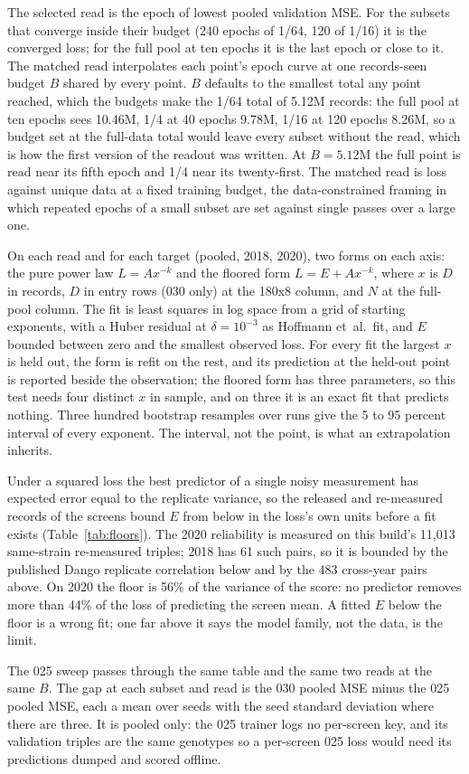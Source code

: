 The selected read is the epoch of lowest pooled validation MSE. For the subsets
that converge inside their budget (240 epochs of 1/64, 120 of 1/16) it is the
converged loss; for the full pool at ten epochs it is the last epoch or close to
it. The matched read interpolates each point's epoch curve at one records-seen
budget $B$ shared by every point. $B$ defaults to the smallest total any point
reached, which the budgets make the 1/64 total of 5.12M records: the full pool at
ten epochs sees 10.46M, 1/4 at 40 epochs 9.78M, 1/16 at 120 epochs 8.26M, so a
budget set at the full-data total would leave every subset without the read,
which is how the first version of the readout was written. At $B = 5.12$M the
full point is read near its fifth epoch and 1/4 near its twenty-first. The
matched read is loss against unique data at a fixed training budget, the
data-constrained framing in which repeated epochs of a small subset are set
against single passes over a large one.

On each read and for each target (pooled, 2018, 2020), two forms on each axis:
the pure power law $L = A x^{-k}$ and the floored form $L = E + A x^{-k}$, where
$x$ is $D$ in records, $D$ in entry rows (030 only) at the 180x8 column, and $N$
at the full-pool column. The fit is least squares in log space from a grid of
starting exponents, with a Huber residual at $\delta = 10^{-3}$ as Hoffmann
et~al.\ fit, and $E$ bounded between zero and the smallest observed loss. For
every fit the largest $x$ is held out, the form is refit on the rest, and its
prediction at the held-out point is reported beside the observation; the floored
form has three parameters, so this test needs four distinct $x$ in sample, and
on three it is an exact fit that predicts nothing. Three hundred bootstrap
resamples over runs give the 5 to 95 percent interval of every exponent. The
interval, not the point, is what an extrapolation inherits.

Under a squared loss the best predictor of a single noisy measurement has
expected error equal to the replicate variance, so the released and re-measured
records of the screens bound $E$ from below in the loss's own units before a fit
exists (Table~\ref{tab:floors}). The 2020 reliability is measured on this build's
11,013 same-strain re-measured triples; 2018 has 61 such pairs, so it is bounded
by the published Dango replicate correlation below and by the 483 cross-year
pairs above. On 2020 the floor is 56\% of the variance of the score: no predictor
removes more than 44\% of the loss of predicting the screen mean. A fitted $E$
below the floor is a wrong fit; one far above it says the model family, not the
data, is the limit.



The 025 sweep passes through the same table and the same two reads at the same
$B$. The gap at each subset and read is the 030 pooled MSE minus the 025 pooled
MSE, each a mean over seeds with the seed standard deviation where there are
three. It is pooled only: the 025 trainer logs no per-screen key, and its
validation triples are the same genotypes so a per-screen 025 loss would need
its predictions dumped and scored offline.

